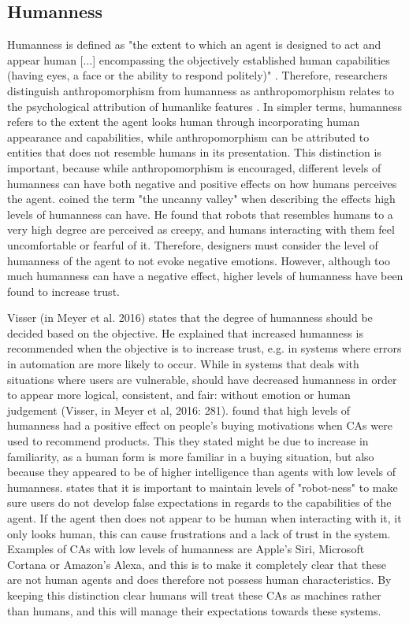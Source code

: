 \subsection{Humanness}
Humanness is defined as "the extent to which an agent is designed to act and appear human [...] encompassing the objectively established human capabilities (having eyes, a face or the ability to respond politely)" \citep{Meyer2016}. Therefore, researchers distinguish anthropomorphism from humanness as anthropomorphism relates to the psychological attribution of humanlike features \citep{Epley2007,Mori1970,Nass2000}. In simpler terms, humanness refers to the extent the agent looks human through incorporating human appearance and capabilities, while anthropomorphism can be attributed to entities that does not resemble humans in its presentation. This distinction is important, because while anthropomorphism is encouraged, different levels of humanness can have both negative and positive effects on how humans perceives the agent. \cite{Mori1970} coined the term "the uncanny valley" when describing the effects high levels of humanness can have. He found that robots that resembles humans to a very high degree are perceived as creepy, and humans interacting with them feel uncomfortable or fearful of it. Therefore, designers must consider the level of humanness of the agent to not evoke negative emotions. However, although too much humanness can have a negative effect, higher levels of humanness have been found to increase trust.

Visser (in Meyer et al. 2016) states that the degree of humanness should be decided based on the objective. He explained that increased humanness is recommended when the objective is to increase trust, e.g. in systems where errors in automation are more likely to occur. While in systems that deals with situations where users are vulnerable, should have decreased humanness in order to appear more logical, consistent, and fair: without emotion or human judgement (Visser, in Meyer et al, 2016: 281). \cite{Terada2015} found that high levels of humanness had a positive effect on people's buying motivations when CAs were used to recommend products. This they stated might be due to increase in familiarity, as a human form is more familiar in a buying situation, but also because they appeared to be of higher intelligence than agents with low levels of humanness. \cite{Disalvo2002} states that it is important to maintain levels of "robot-ness" to make sure users do not develop false expectations in regards to the capabilities of the agent. If the agent then does not appear to be human when interacting with it, it only looks human, this can cause frustrations and a lack of trust in the system. Examples of CAs with low levels of humanness are Apple's Siri, Microsoft Cortana or Amazon's Alexa, and this is to make it completely clear that these are not human agents and does therefore not possess human characteristics. By keeping this distinction clear humans will treat these CAs as machines rather than humans, and this will manage their expectations towards these systems.

